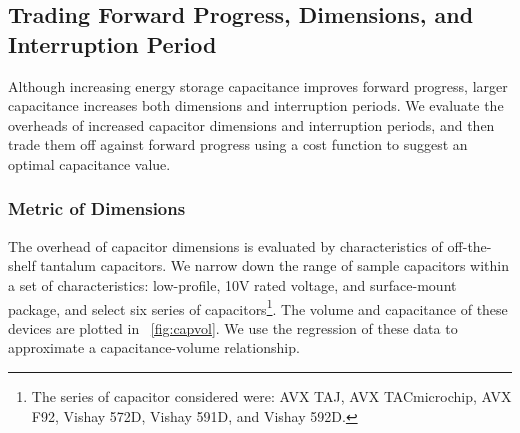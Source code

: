 
\subsection{Trading Forward Progress, Dimensions, and Interruption Period} \label{subsec:tradeoff}


Although increasing energy storage capacitance improves forward progress, larger capacitance increases both dimensions and interruption periods. We evaluate the overheads of increased capacitor dimensions and interruption periods, and then trade them off against forward progress using a cost function to suggest an optimal capacitance value. 

\subsubsection{Metric of Dimensions}

The overhead of capacitor dimensions is evaluated by characteristics of off-the-shelf tantalum capacitors. We narrow down the range of sample capacitors within a set of characteristics: low-profile, 10V rated voltage, and surface-mount package, and select six series of capacitors\footnote{The series of capacitor considered were: AVX TAJ, AVX TACmicrochip, AVX F92, Vishay 572D, Vishay 591D, and Vishay 592D.}. The volume and capacitance of these devices are plotted in \figurename{~\ref{fig:capvol}}. We use the regression of these data to approximate a capacitance-volume relationship.

